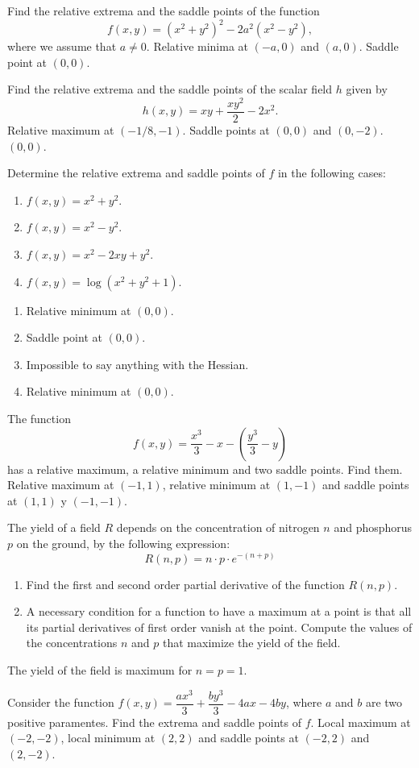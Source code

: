 
{Find the relative extrema and the saddle points of the function
\[
f(x,y) = (x^2+y^2)^2-2a^2(x^2-y^2),
\]
where we assume that $a\neq 0$.
}
{Relative minima at $(-a,0)$ and $(a,0)$. Saddle point at $(0,0)$.
}
{
}


{Find the relative extrema and the saddle points of the scalar field $h$ given by
\[
h(x,y) = xy+\frac{xy^2}{2}-2x^2.
\]
}
{Relative maximum at $(-1/8,-1)$. Saddle points at $(0,0)$ and $(0,-2)$.
$(0,0)$.
}
{
}

{Determine the relative extrema and saddle points of $f$ in the following cases:
\begin{enumerate}
\item $f(x,y) = x^2+y^2$.
\item $f(x,y) = x^2-y^2$.
\item $f(x,y) = x^2-2xy+y^2$.
\item $f(x,y) = \log(x^2+y^2+1)$.
\end{enumerate}
}
{\begin{enumerate}
\item Relative minimum at $(0,0)$.
\item Saddle point at $(0,0)$.
\item Impossible to say anything with the Hessian.
\item Relative minimum at $(0,0)$.
\end{enumerate}
}
{
}


{The function
\[
f(x,y) = \frac{x^3}{3}-x-\left(\frac{y^3}{3}-y\right)
\]
has a relative maximum, a relative minimum and two saddle points.
Find them.
}
{Relative maximum at $(-1,1)$, relative minimum at $(1,-1)$ and saddle points at $(1,1)$ y $(-1,-1)$.
}
{
}


{The yield of a field $R$ depends on the concentration of nitrogen $n$ and phosphorus $p$ on the ground, by the following expression:
\[
R(n,p)=n\cdot p\cdot e^{-(n+p)}
\]
\begin{enumerate}
\item Find the first and second order partial derivative of the function $R(n,p)$.
\item A necessary condition for a function to have a maximum at a point is that all its partial derivatives of first order vanish at the point.
Compute the values of the concentrations $n$ and $p$ that maximize the yield of the field.
\end{enumerate}
}
{The yield of the field is maximum for $n=p=1$.
}
{
}

{Consider the function $f(x,y)=\dfrac{ax^3}{3} + \dfrac{by^3}{3}-4ax-4by$, where $a$ and $b$ are two positive paramentes.
Find the extrema and saddle points of $f$.
}
{Local maximum at $(-2,-2)$, local minimum at $(2,2)$ and saddle points at $(-2,2)$ and $(2,-2)$.
}
{
}
